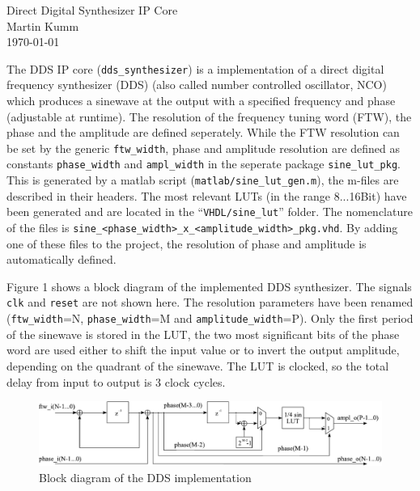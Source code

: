 \documentclass[a4paper,BCOR7mm,12pt,pointlessnumbers,bibtotoc]{scrartcl}
\begin{document}
\begin{center}
\Large Direct Digital Synthesizer IP Core\\[0.4cm]
\large Martin Kumm \\[0.5cm]
\large \today \\[0.5cm]
\end{center}


The DDS IP core (\verb|dds_synthesizer|) is a implementation of a direct digital frequency synthesizer (DDS) (also called number controlled oscillator, NCO) which produces a sinewave at the output with a specified frequency and phase (adjustable at runtime). The resolution of the frequency tuning word (FTW), the phase and the amplitude are defined seperately. While the FTW resolution can be set by the generic \verb|ftw_width|, phase and amplitude resolution are defined as constants \verb|phase_width| and \verb|ampl_width| in the seperate package \verb|sine_lut_pkg|. This is generated by a matlab script (\verb|matlab/sine_lut_gen.m|), the m-files are described in their headers. The most relevant LUTs (in the range 8...16Bit) have been generated and are located in the ``\verb|VHDL/sine_lut|'' folder. The nomenclature of the files is \verb|sine_<phase_width>_x_<amplitude_width>_pkg.vhd|. By adding one of these files to the project, the resolution of phase and amplitude is automatically defined.

Figure 1 shows a block diagram of the implemented DDS synthesizer. The signals \verb|clk| and \verb|reset| are not shown here. The resolution parameters have been renamed (\verb|ftw_width|=N, \verb|phase_width|=M and \verb|amplitude_width|=P). Only the first period of the sinewave is stored in the LUT, the two most significant bits of the phase word are used either to shift the input value or to invert the output amplitude, depending on the quadrant of the sinewave. The LUT is clocked, so the total delay from input to output is 3 clock cycles. 
\begin{figure}[H]
  \centering
    \includegraphics[width=14cm]{images/dds_implementation}
  \caption{Block diagram of the DDS implementation}
  \label{fig:dds_implementation}
\end{figure}
\end{document}
